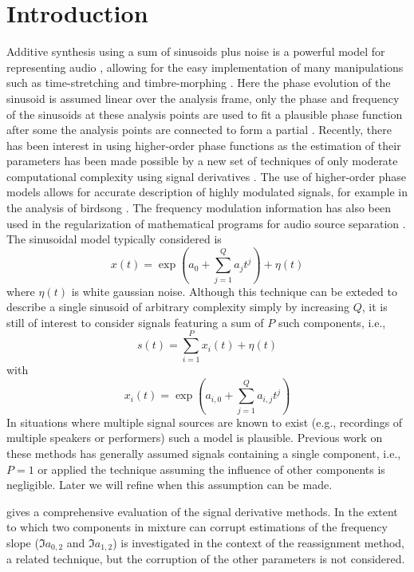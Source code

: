 \documentclass[twoside,a4paper]{article}
\begin{document}
\section{Introduction}
\label{sec:intro}
Additive synthesis using a sum of sinusoids plus noise is a powerful model for
representing audio \cite{serra1989system}, allowing for the easy implementation
of many manipulations such as time-stretching \cite{marchand2004enhanced} and
timbre-morphing \cite{haken2007beyond}.
%
Here the phase evolution of the sinusoid is assumed linear over
the analysis frame, only the phase and frequency of the sinusoids at these
analysis points are used to fit a plausible phase function after some
the analysis points are connected to form a partial
\cite{mcaulay1986speech}. 
%
Recently, there has
been interest in using higher-order phase functions \cite{xuepiecewise} as the estimation of
their parameters has been made possible by a new set of techniques of only
moderate computational complexity using signal derivatives \cite{hamilton2011non}.
%
The use
of higher-order phase models allows for accurate description of highly modulated
signals, for
example in the analysis of birdsong \cite{stowell2013improved}.
%
The frequency
modulation information has also been used in the
regularization of mathematical programs for audio source separation \cite{creager2016musicalsource}.
%
The sinusoidal model typically considered is
%
\begin{equation}
    \label{eq:polyphaseexp}
    x(t) = \exp(a_0 + \sum_{j=1}^{Q} a_j t^j) + \eta(t)
\end{equation}
where $\eta(t)$ is white gaussian noise.
%
Although this technique can be exteded to describe a single
sinusoid of arbitrary complexity simply by increasing $Q$, it is still of
interest to consider signals featuring a sum of $P$ such components, i.e.,
%
\begin{equation}
    \label{eq:polyphaseexpmix}
    s(t) = \sum_{i=1}^{P} x_{i}(t) + \eta(t)
\end{equation}
%
with
%
\[
    x_{i}(t) = \exp(a_{i,0} + \sum_{j=1}^{Q} a_{i,j} t^j)
\]
%
In situations where multiple signal sources are known to exist (e.g., recordings
of multiple speakers or performers) such a model is plausible.
%
Previous work on these methods has generally assumed signals containing a single
component, i.e., $P=1$ or applied the technique assuming the influence of other
components is negligible. Later we will refine when this assumption can be made.

\cite{hamilton2012comparisons} gives a comprehensive evaluation of the signal
derivative methods. In \cite{robel2002estimating} the extent to which two
components in mixture can corrupt estimations of the frequency slope
($\Im{a_{0,2}}$ and $\Im{a_{1,2}}$) is investigated in the context of the
reassignment method, a related technique, but the corruption of the other
parameters is not considered.
\end{document}
